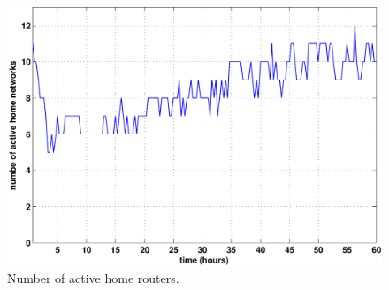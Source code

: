 
\begin{figure}[t]
\begin{center}
\includegraphics[width=1\linewidth]{results/on_routers.pdf}
\caption{Number of active home routers.}
\label{fig:active_routers}
\end{center}
\end{figure}


